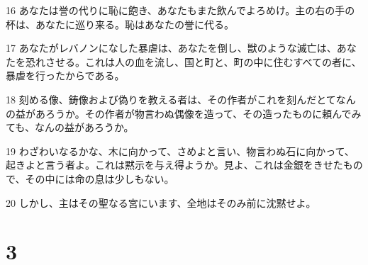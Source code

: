 \par 16 あなたは誉の代りに恥に飽き、あなたもまた飲んでよろめけ。主の右の手の杯は、あなたに巡り来る。恥はあなたの誉に代る。
\par 17 あなたがレバノンになした暴虐は、あなたを倒し、獣のような滅亡は、あなたを恐れさせる。これは人の血を流し、国と町と、町の中に住むすべての者に、暴虐を行ったからである。
\par 18 刻める像、鋳像および偽りを教える者は、その作者がこれを刻んだとてなんの益があろうか。その作者が物言わぬ偶像を造って、その造ったものに頼んでみても、なんの益があろうか。
\par 19 わざわいなるかな、木に向かって、さめよと言い、物言わぬ石に向かって、起きよと言う者よ。これは黙示を与え得ようか。見よ、これは金銀をきせたもので、その中には命の息は少しもない。
\par 20 しかし、主はその聖なる宮にいます、全地はそのみ前に沈黙せよ。

\chapter{3}

